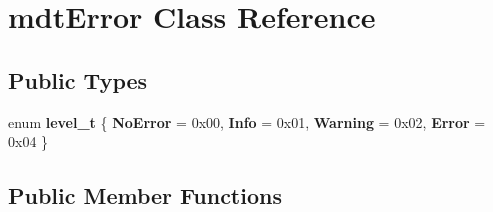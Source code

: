 \hypertarget{classmdt_error}{
\section{mdtError Class Reference}
\label{classmdt_error}
}
\subsection*{Public Types}
\begin{DoxyCompactItemize}
\item 
enum {\bfseries level\_\-t} \{ {\bfseries NoError} =  0x00, 
{\bfseries Info} =  0x01, 
{\bfseries Warning} =  0x02, 
{\bfseries Error} =  0x04
 \}
\end{DoxyCompactItemize}
\subsection*{Public Member Functions}
